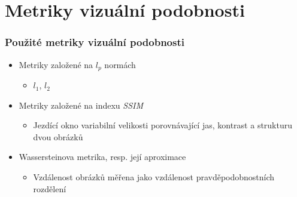 \documentclass[czech]{beamer}
\begin{document}
\section{Metriky vizuální podobnosti}

\begin{frame}
    \frametitle{Použité metriky vizuální podobnosti}
    \begin{itemize}
        \item Metriky založené na $l_p$ normách
        \begin{itemize}
            \item $l_1$, $l_2$
        \end{itemize}
        \item Metriky založené na indexu \emph{SSIM}
        \begin{itemize}
            \item Jezdící okno variabilní velikosti porovnávající jas, kontrast a strukturu dvou obrázků
        \end{itemize}
        \item Wassersteinova metrika, resp. její aproximace
        \begin{itemize}
            \item Vzdálenost obrázků měřena jako vzdálenost pravděpodobnostních rozdělení
        \end{itemize}
    \end{itemize}
\end{frame}
\end{document}
